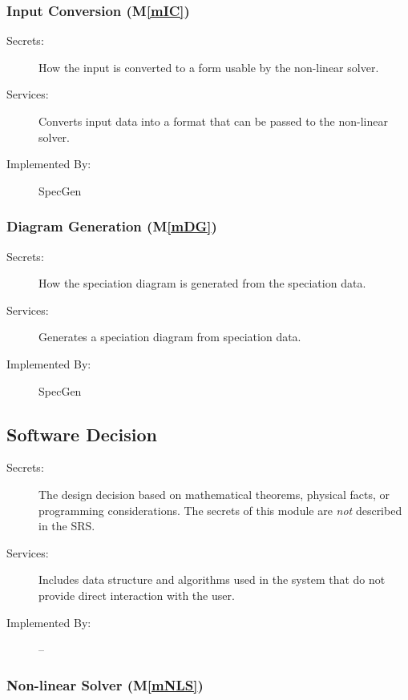 \documentclass[12pt, titlepage]{article}
\newcommand{\mref}[1]{M\ref{#1}}
\newcommand{\progname}{SpecGen}
\begin{document}
\subsubsection{Input Conversion (\mref{mIC})}

\begin{description}
\item[Secrets:]How the input is converted to a form usable by the non-linear 
  solver.
\item[Services:]Converts input data into a format that can be passed to the 
  non-linear solver.
\item[Implemented By:] \progname{}
\end{description}

\subsubsection{Diagram Generation (\mref{mDG})}

\begin{description}
\item[Secrets:]How the speciation diagram is generated from the speciation data.
\item[Services:]Generates a speciation diagram from speciation data.
\item[Implemented By:] \progname{}
\end{description}



\subsection{Software Decision}

\begin{description}
\item[Secrets:] The design decision based on mathematical theorems, physical
  facts, or programming considerations. The secrets of this module are
  \emph{not} described in the SRS.
\item[Services:] Includes data structure and algorithms used in the system that
  do not provide direct interaction with the user. 
\item[Implemented By:] --
\end{description}

\subsubsection{Non-linear Solver (\mref{mNLS})}
\end{document}
